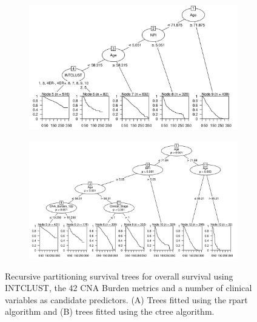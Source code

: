 \begin{figure}[!htb]
\centering

\vspace{1cm}

\begin{subfigure}{\textwidth}
\subcaption{}
\includegraphics[width=1\textwidth]{../figures/Appendices/Appendix_B/Clin_PA_PartyKit_Survival_Burden_OS_INTCLUST.png}
\end{subfigure}

\vspace{2cm}

\begin{subfigure}{\textwidth}
\subcaption{}
\includegraphics[width=1\textwidth]{../figures/Appendices/Appendix_B/Clin_PA_Ctree_Survival_Burden_OS_INTCLUST.png}
\end{subfigure}

\vspace{1cm}

\caption[Recursive partitioning survival trees for overall survival using INTCLUST, the 42 CNA Burden metrics and a number of clinical variables as candidate predictors.]{Recursive partitioning survival trees for overall survival using INTCLUST, the 42 CNA Burden metrics and a number of clinical variables as candidate predictors. (A) Trees fitted using the rpart algorithm and (B) trees fitted using the ctree algorithm.}
\end{figure}

